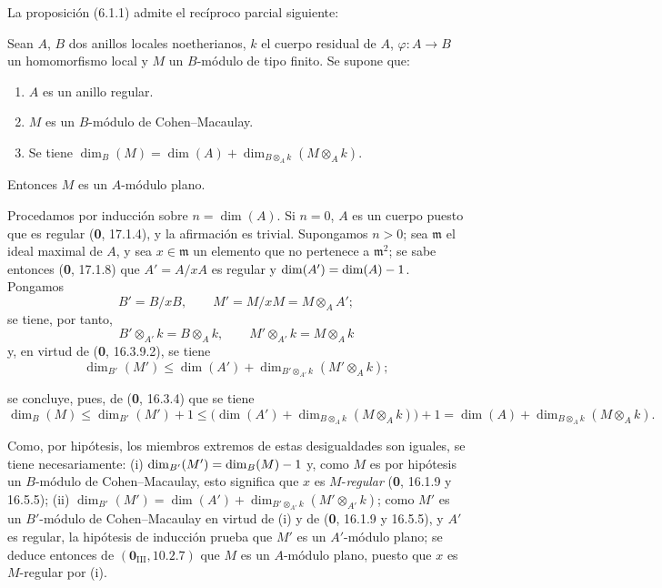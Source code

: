 La proposición (6.1.1) admite el recíproco parcial siguiente:

\begin{proposition}[6.1.5]
Sean $A$, $B$ dos anillos locales noetherianos, $k$ el cuerpo residual de
$A$, $\varphi:A\to B$ un homomorfismo local y $M$ un $B$-módulo de tipo finito.
Se supone que:
\begin{enumerate}
\item[\textup{1\textsuperscript{o}}] $A$ es un anillo regular.
\item[\textup{2\textsuperscript{o}}] $M$ es un $B$-módulo de Cohen--Macaulay.
\item[\textup{3\textsuperscript{o}}] Se tiene
$\dim_B(M)=\dim(A)+\dim_{B\otimes_Ak}(M\otimes_Ak)$.
\end{enumerate}
Entonces $M$ es un $A$-módulo plano.
\end{proposition}

Procedamos por inducción sobre $n=\dim(A)$. Si $n=0$, $A$ es un cuerpo
puesto que es regular (\textbf 0, 17.1.4), y la afirmación es trivial. Supongamos
$n>0$; sea $\mathfrak m$ el ideal maximal de $A$, y sea
$x\in\mathfrak m$ un elemento que no pertenece a $\mathfrak m^2$; se sabe
entonces (\textbf 0, 17.1.8) que $A'=A/xA$ es regular y
$\dim(A')=\dim(A)- 1$. Pongamos
\[
B'=B/xB,\qquad M'=M/xM=M\otimes_AA';
\]
se tiene, por tanto,
\[
B'\otimes_{A'}k=B\otimes_Ak,\qquad
M'\otimes_{A'}k=M\otimes_Ak
\]
y, en virtud de (\textbf 0, 16.3.9.2), se tiene
\[
\dim_{B'}(M')\leq\dim(A')+
\dim_{B'\otimes_{A'}k}(M'\otimes_Ak);
\]


se concluye, pues, de (\textbf 0, 16.3.4) que se tiene
\[
\dim_B(M)\leq\dim_{B'}(M')+1
\leq\bigl(\dim(A')+
\dim_{B\otimes_Ak}(M\otimes_Ak)\bigr)+1
=\dim(A)+\dim_{B\otimes_Ak}(M\otimes_Ak).
\]

Como, por hipótesis, los miembros extremos de estas desigualdades son iguales,
se tiene necesariamente: (i) $\dim_{B'}(M')=\dim_B(M)- 1$ y, como $M$ es por
hipótesis un $B$-módulo de Cohen--Macaulay, esto significa que $x$ es
$M$-\emph{regular} (\textbf 0, 16.1.9 y 16.5.5); (ii)
$\dim_{B'}(M')=\dim(A')+
\dim_{B'\otimes_{A'}k}(M'\otimes_{A'}k)$; como $M'$ es un $B'$-módulo de
Cohen--Macaulay en virtud de (i) y de (\textbf 0, 16.1.9 y 16.5.5), y $A'$ es regular,
la hipótesis de inducción prueba que $M'$ es un $A'$-módulo plano; se deduce
entonces de $(\mathbf{0}_{\mathrm{III}}, 10.2.7)$ que $M$ es un $A$-módulo plano,
puesto que $x$ es $M$-regular por (i).
